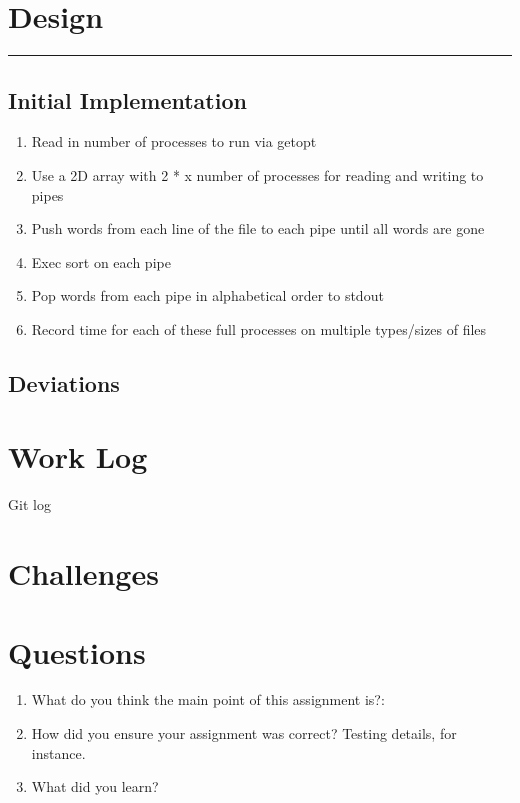 \documentclass[fleqn,10pt,titlepage]{article}
\begin{document}
\section{Design}
\hrule
\subsection{Initial Implementation}
\begin{enumerate}
\item Read in number of processes to run via getopt \\
\item Use a 2D array with 2 * x number of processes for reading and writing to pipes \\
\item Push words from each line of the file to each pipe until all words are gone \\
\item Exec sort on each pipe \\
\item Pop words from each pipe in alphabetical order to stdout \\
\item Record time for each of these full processes on multiple types/sizes of files \\
\end{enumerate}
\subsection{Deviations}
\clearpage

\section{Work Log}
Git log
\clearpage

\section{Challenges}
\begin{itemize}
\end{itemize}
\clearpage

\section{Questions}
\begin{enumerate}
\item What do you think the main point of this assignment is?:  \\ 
\item How did you ensure your assignment was correct? Testing details, for instance. \\ 
\item What did you learn? \\ 
\end{enumerate}
\end{document}
